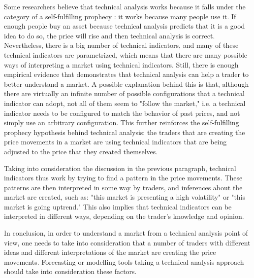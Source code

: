 Some researchers believe that technical analysis works because it falls under
the category of a self-fulfilling prophecy \cite{salganik2008leading}: it works
because many people use it. If enough people buy an asset because technical
analysis predicts that it is a good idea to do so, the price will rise and then
technical analysis is correct. Nevertheless, there is a big number of technical
indicators, and many of these technical indicators are parametrized, which means
that there are many possible ways of interpreting a market using technical
indicators. Still, there is enough empirical evidence that demonstrates that
technical analysis can help a trader to better understand a market. 
A possible
explanation behind this is that, although there are virtually an infinite number
of possible configurations that a technical indicator can adopt, not all of them
seem to "follow the market," i.e. a technical indicator needs to be configured
to match the behavior of past prices, and not simply use an arbitrary
configuration. This further reinforces the self-fulfilling prophecy hypothesis
behind technical analysis: the traders that are creating the price movements in
a market are using technical indicators that are being adjusted to the price
that they created themselves.

Taking into consideration the discussion in the previous paragraph, technical
indicators thus work by trying to find a pattern in the price movements. These
patterns are then interpreted in some way by traders, and inferences about the
market are created, such as: "this market is presenting a high volatility" or
"this market is going uptrend." This also implies that technical indicators can
be interpreted in different ways, depending on the trader's knowledge and
opinion.

In conclusion, in order to understand a market from a technical analysis point
of view, one needs to take into consideration that a number of traders with
different ideas and different interpretations of the market are creating the
price movements. Forecasting or modelling tools taking a technical analysis
approach should take into consideration these factors.



